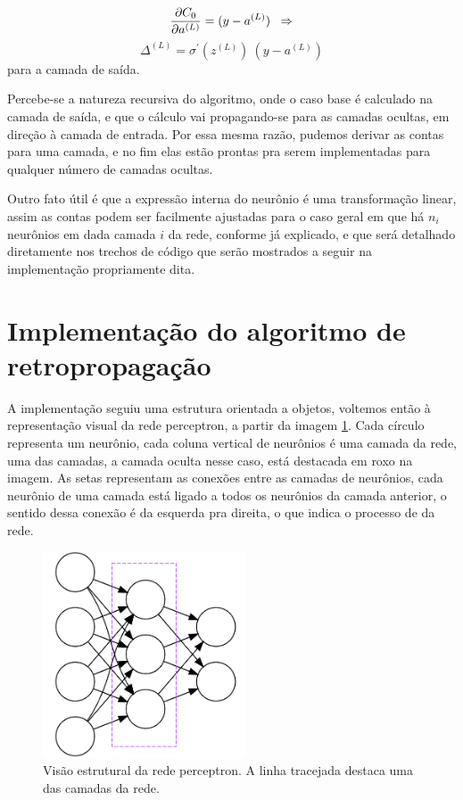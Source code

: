 \[ \dfrac{\partial C_0}{\partial a^{(L)}} = (y - a^{(L)}) \;\;\Rightarrow \]
\begin{equation}\label{retro:16}
\Delta^{(L)} = \sigma^{'}(z^{(L)})~ (y - a^{(L)})
\end{equation}
para a camada de saída.

Percebe-se a natureza recursiva do algoritmo, onde o caso base é calculado na camada de saída, e que o cálculo vai propagando-se para as camadas ocultas, em direção à camada de entrada. Por essa mesma razão, pudemos derivar as contas para uma camada, e no fim elas estão prontas pra serem implementadas para qualquer número de camadas ocultas. 

Outro fato útil é que a expressão interna do neurônio é uma transformação linear, assim as contas podem ser facilmente ajustadas para o caso geral em que há $n_i$ neurônios em dada camada $i$ da rede, conforme já explicado, e que será detalhado diretamente nos trechos de código que serão mostrados a seguir na implementação propriamente dita.

\section{Implementação do algoritmo de retropropagação}

A implementação seguiu uma estrutura orientada a objetos, voltemos então à representação visual da rede perceptron, a partir da imagem \ref{fig:estrutura_rn}. Cada círculo representa um neurônio, cada coluna vertical de neurônios é uma camada da rede, uma das camadas, a camada oculta nesse caso, está destacada em roxo na imagem. As setas representam as conexões entre as camadas de neurônios, cada neurônio de uma camada está ligado a todos os neurônios da camada anterior, o sentido dessa conexão é da esquerda pra direita, o que indica o processo de  da rede.

\begin{figure}[htb]
\centering
\includegraphics[width=6cm]{figuras/estrutura_rn}
\caption{Visão estrutural da rede perceptron. A linha tracejada destaca uma das camadas da rede.}
\label{fig:estrutura_rn}
\end{figure}

